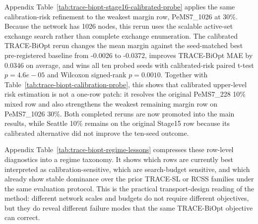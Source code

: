 Appendix Table~\ref{tab:trace-biopt-stage16-calibrated-probe} applies the same
calibration-risk refinement to the weakest margin row, PeMS7\_1026 at 30\%.
Because the network has 1026 nodes, this rerun uses the scalable active-set
exchange search rather than complete exchange enumeration. The calibrated
TRACE-BiOpt rerun changes the mean margin against the seed-matched best
pre-registered baseline from -0.0026 to -0.0372, improves TRACE-BiOpt MAE by
0.0346 on average, and wins all ten probed seeds with calibrated-risk paired
t-test $p=4.6e{-}05$ and Wilcoxon signed-rank $p=0.0010$. Together with
Table~\ref{tab:trace-biopt-calibration-probe}, this shows that calibrated
upper-level risk estimation is not a one-row patch: it resolves the original
PeMS7\_228 10\% mixed row and also strengthens the weakest remaining margin
row on PeMS7\_1026 30\%. Both completed reruns are now promoted into the main
results, while Seattle 10\% remains on the original Stage15 row because its
calibrated alternative did not improve the ten-seed outcome.

Appendix Table~\ref{tab:trace-biopt-regime-lessons} compresses these row-level
diagnostics into a regime taxonomy. It shows which rows are
currently best interpreted as calibration-sensitive, which are search-budget
sensitive, and which already show stable dominance over the prior TRACE-SL or
RCSS families under the same evaluation protocol. This is the practical
transport-design reading of the method: different network scales and budgets do
not require different objectives, but they do reveal different failure modes
that the same TRACE-BiOpt objective can correct.
